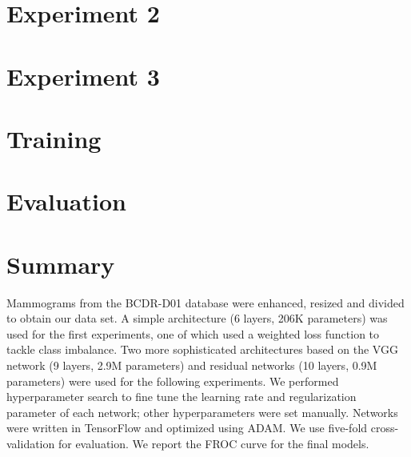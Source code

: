\section{Experiment 2}
\label{sec:Experiment2}


\section{Experiment 3}
\label{sec:Experiment3}


\section{Training}


\section{Evaluation}


\section{Summary}
Mammograms from the BCDR-D01 database were enhanced, resized and divided to obtain our data set. A simple architecture (6 layers, 206K parameters) was used for the first experiments, one of which used a weighted loss function to tackle class imbalance. Two more sophisticated architectures based on the VGG network (9 layers, 2.9M parameters) and residual networks (10 layers, 0.9M parameters) were used for the following experiments. We performed hyperparameter search to fine tune the learning rate and regularization parameter of each network; other hyperparameters were set manually. Networks were written in TensorFlow and optimized using ADAM. We use five-fold cross-validation for evaluation. We report the FROC curve for the final models.
